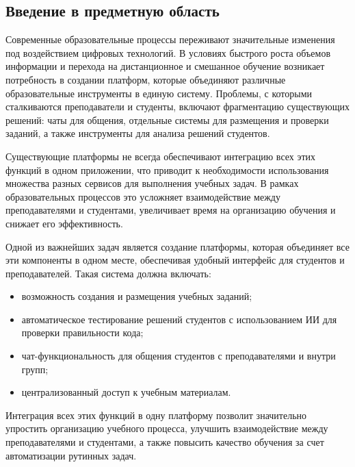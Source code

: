 \subsection*{Введение в предметную область}

Современные образовательные процессы переживают значительные изменения под воздействием цифровых технологий. В условиях быстрого роста объемов информации и перехода на дистанционное и смешанное обучение возникает потребность в создании платформ, которые объединяют различные образовательные инструменты в единую систему. Проблемы, с которыми сталкиваются преподаватели и студенты, включают фрагментацию существующих решений: чаты для общения, отдельные системы для размещения и проверки заданий, а также инструменты для анализа решений студентов.

Существующие платформы не всегда обеспечивают интеграцию всех этих функций в одном приложении, что приводит к необходимости использования множества разных сервисов для выполнения учебных задач. В рамках образовательных процессов это усложняет взаимодействие между преподавателями и студентами, увеличивает время на организацию обучения и снижает его эффективность.

Одной из важнейших задач является создание платформы, которая объединяет все эти компоненты в одном месте, обеспечивая удобный интерфейс для студентов и преподавателей. Такая система должна включать:
\begin{itemize}
  \item возможность создания и размещения учебных заданий;
  \item автоматическое тестирование решений студентов с использованием ИИ для проверки правильности кода;
  \item чат-функциональность для общения студентов с преподавателями и внутри групп;
  \item централизованный доступ к учебным материалам.
\end{itemize}

Интеграция всех этих функций в одну платформу позволит значительно упростить организацию учебного процесса, улучшить взаимодействие между преподавателями и студентами, а также повысить качество обучения за счет автоматизации рутинных задач.